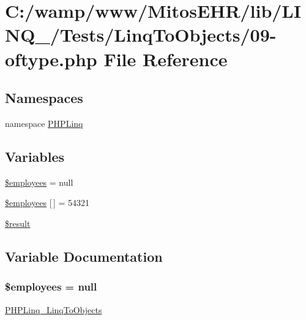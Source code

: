 \hypertarget{_linq_to_objects_209-oftype_8php}{\section{\-C\-:/wamp/www/\-Mitos\-E\-H\-R/lib/\-L\-I\-N\-Q\-\_/\-Tests/\-Linq\-To\-Objects/09-\/oftype.php \-File \-Reference}
\label{_linq_to_objects_209-oftype_8php}
}
\subsection*{\-Namespaces}
\begin{DoxyCompactItemize}
\item 
namespace \hyperlink{namespace_p_h_p_linq}{\-P\-H\-P\-Linq}
\end{DoxyCompactItemize}
\subsection*{\-Variables}
\begin{DoxyCompactItemize}
\item 
\hyperlink{_linq_to_objects_209-oftype_8php_a598c06abe9d65a9d2990e39693ce2c27}{\$employees} = null
\item 
\hyperlink{_linq_to_objects_209-oftype_8php_ac6c9b1497734c730d854ef71d906cf0f}{\$employees} \mbox{[}$\,$\mbox{]} = 54321
\item 
\hyperlink{_linq_to_objects_209-oftype_8php_a112ef069ddc0454086e3d1e6d8d55d07}{\$result}
\end{DoxyCompactItemize}


\subsection{\-Variable \-Documentation}
\hypertarget{_linq_to_objects_209-oftype_8php_a598c06abe9d65a9d2990e39693ce2c27}{
\subsubsection[{\$employees}]{\setlength{\rightskip}{0pt plus 5cm}\$employees = null}}\label{_linq_to_objects_209-oftype_8php_a598c06abe9d65a9d2990e39693ce2c27}
\hyperlink{class_p_h_p_linq___linq_to_objects}{\-P\-H\-P\-Linq\-\_\-\-Linq\-To\-Objects} 

